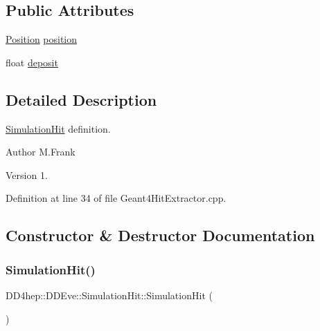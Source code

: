 \subsection*{Public Attributes}
\begin{DoxyCompactItemize}
\item 
\hyperlink{namespace_d_d4hep_1_1_geometry_a55083902099d03506c6db01b80404900}{Position} \hyperlink{class_d_d4hep_1_1_d_d_eve_1_1_simulation_hit_a3ac34457c4fec010a96bdd309c14544c}{position}
\item 
float \hyperlink{class_d_d4hep_1_1_d_d_eve_1_1_simulation_hit_a96d56e1a81de2176ab0e856ba6394799}{deposit}
\end{DoxyCompactItemize}


\subsection{Detailed Description}
\hyperlink{class_d_d4hep_1_1_d_d_eve_1_1_simulation_hit}{Simulation\+Hit} definition. 

\begin{DoxyAuthor}{Author}
M.\+Frank 
\end{DoxyAuthor}
\begin{DoxyVersion}{Version}
1. 
\end{DoxyVersion}


Definition at line 34 of file Geant4\+Hit\+Extractor.\+cpp.



\subsection{Constructor \& Destructor Documentation}
\hypertarget{class_d_d4hep_1_1_d_d_eve_1_1_simulation_hit_a52422ccbc4cabcf550a4295a3ae69fac}{}\label{class_d_d4hep_1_1_d_d_eve_1_1_simulation_hit_a52422ccbc4cabcf550a4295a3ae69fac} 
\subsubsection{\texorpdfstring{Simulation\+Hit()}{SimulationHit()}\hspace{0.1cm}{\footnotesize\ttfamily [1/3]}}
{\footnotesize\ttfamily D\+D4hep\+::\+D\+D\+Eve\+::\+Simulation\+Hit\+::\+Simulation\+Hit (\begin{DoxyParamCaption}{ }\end{DoxyParamCaption})\hspace{0.3cm}{\ttfamily [inline]}}



